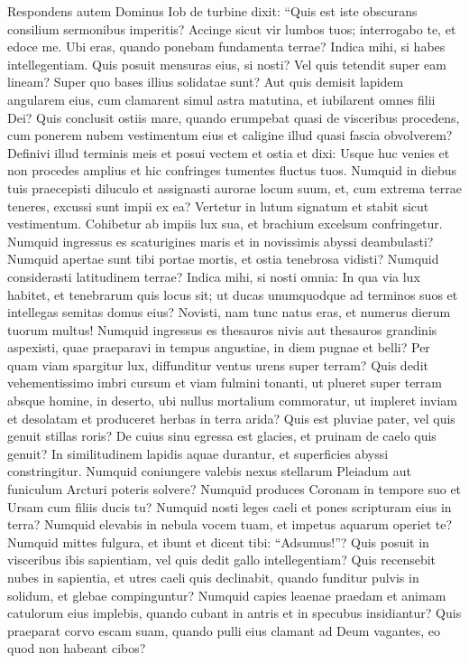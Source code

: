 \begin{biblechapter}  
\verse Respondens autem Dominus Iob de turbine dixit: 
\verse “Quis est iste obscurans consilium sermonibus imperitis? 
\verse Accinge sicut vir lumbos tuos; interrogabo te, et edoce me. 
\verse Ubi eras, quando ponebam fundamenta terrae? Indica mihi, si habes intellegentiam. 
\verse Quis posuit mensuras eius, si nosti? Vel quis tetendit super eam lineam? 
\verse Super quo bases illius solidatae sunt? Aut quis demisit lapidem angularem eius, 
\verse cum clamarent simul astra matutina, et iubilarent omnes filii Dei? 
\verse Quis conclusit ostiis mare, quando erumpebat quasi de visceribus procedens, 
\verse cum ponerem nubem vestimentum eius et caligine illud quasi fascia obvolverem? 
\verse Definivi illud terminis meis et posui vectem et ostia 
\verse et dixi: Usque huc venies et non procedes amplius et hic confringes tumentes fluctus tuos. 
\verse Numquid in diebus tuis praecepisti diluculo et assignasti aurorae locum suum, 
\verse et, cum extrema terrae teneres, excussi sunt impii ex ea? 
\verse Vertetur in lutum signatum et stabit sicut vestimentum. 
\verse Cohibetur ab impiis lux sua, et brachium excelsum confringetur. 
\verse Numquid ingressus es scaturigines maris et in novissimis abyssi deambulasti? 
\verse Numquid apertae sunt tibi portae mortis, et ostia tenebrosa vidisti? 
\verse Numquid considerasti latitudinem terrae? Indica mihi, si nosti omnia: 
\verse In qua via lux habitet, et tenebrarum quis locus sit; 
\verse ut ducas unumquodque ad terminos suos et intellegas semitas domus eius? 
\verse Novisti, nam tunc natus eras, et numerus dierum tuorum multus! 
\verse Numquid ingressus es thesauros nivis aut thesauros grandinis aspexisti, 
\verse quae praeparavi in tempus angustiae, in diem pugnae et belli? 
\verse Per quam viam spargitur lux, diffunditur ventus urens super terram? 
\verse Quis dedit vehementissimo imbri cursum et viam fulmini tonanti, 
\verse ut plueret super terram absque homine, in deserto, ubi nullus mortalium commoratur, 
\verse ut impleret inviam et desolatam et produceret herbas in terra arida? 
\verse Quis est pluviae pater, vel quis genuit stillas roris? 
\verse De cuius sinu egressa est glacies, et pruinam de caelo quis genuit? 
\verse In similitudinem lapidis aquae durantur, et superficies abyssi constringitur. 
\verse Numquid coniungere valebis nexus stellarum Pleiadum aut funiculum Arcturi poteris solvere? 
\verse Numquid produces Coronam in tempore suo et Ursam cum filiis ducis tu? 
\verse Numquid nosti leges caeli et pones scripturam eius in terra? 
\verse Numquid elevabis in nebula vocem tuam, et impetus aquarum operiet te? 
\verse Numquid mittes fulgura, et ibunt et dicent tibi: “Adsumus!”? 
\verse Quis posuit in visceribus ibis sapientiam, vel quis dedit gallo intellegentiam? 
\verse Quis recensebit nubes in sapientia, et utres caeli quis declinabit, 
\verse quando funditur pulvis in solidum, et glebae compinguntur? 
\verse Numquid capies leaenae praedam et animam catulorum eius implebis, 
\verse quando cubant in antris et in specubus insidiantur? 
\verse Quis praeparat corvo escam suam, quando pulli eius clamant ad Deum vagantes, eo quod non habeant cibos? 
\end{biblechapter}

